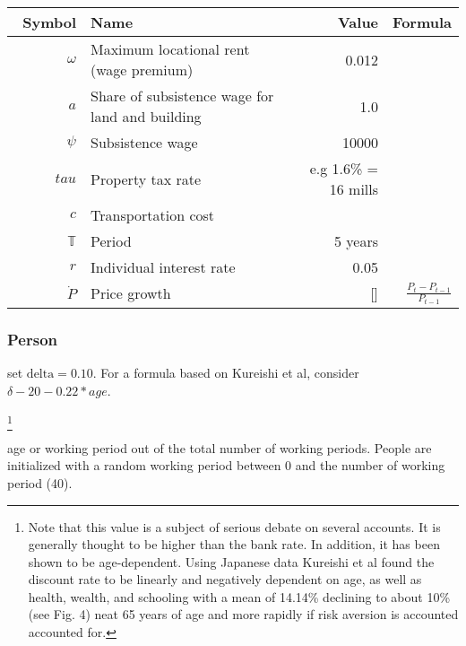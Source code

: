 \renewcommand{\arraystretch}{1.5}
\begin{tabular}{rlrr}\
Symbol         & Name                                 & Value      & Formula  \\ \hline
$\omega$  & Maximum locational rent (wage premium) & 0.012        \\
$a$       & Share of subsistence wage for land and building & 1.0 \\
$\psi$    & Subsistence wage & 10000 \\
$tau$     & Property tax rate &  e.g 1.6\% = 16 mills           & \\
$c$       & Transportation cost & \\
$\mathbb{T}$       & Period & 5 years      \\
$r$       & Individual interest rate & 0.05 \\\
$\dot P $      & Price growth                         & []         & $\frac{P_t-P_{t-1}}{P_{t-1}}$\\
\end{tabular}
\renewcommand{\arraystretch}{1.0}



 

\subsubsection{Person}
\begin{description}
{\color{red}
\item[subjective discount rate] set $\mathrm{delta} = 0.10$.  For a formula based on Kureishi et al, consider $\delta- 20-0.22*age$.}
\footnote{Note that this value is a subject of serious debate on several accounts. It is generally thought to be higher than the bank rate. In addition, it has been shown to be age-dependent. Using Japanese data Kureishi et al \cite{kureishiTimePreferencesLife2021} found the discount rate to be linearly and negatively dependent on age, as well as health, wealth, and schooling with a mean of 14.14\%  declining %
to about 10\% (see Fig. 4) neat 65 years of age and more rapidly if risk aversion is accounted accounted for. 
}



\item[working period] age or working period out of the total number of working periods. People are initialized with a random working period between 0 and the number of working period (40).
\end{description}

